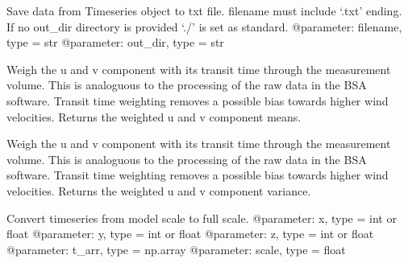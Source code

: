 \documentclass[letterpaper,10pt,english]{sphinxmanual}
\begin{document}
\begin{fulllineitems}
\begin{fulllineitems}
\end{fulllineitems}


\begin{fulllineitems}
\label{\detokenize{index:windtunnel.Timeseries_nc.save2file}}
Save data from Timeseries object to txt file. filename must include
‘.txt’ ending. If no out\_dir directory is provided ‘./’ is set as
standard.
@parameter: filename, type = str
@parameter: out\_dir, type = str

\end{fulllineitems}


\begin{fulllineitems}
\label{\detokenize{index:windtunnel.Timeseries_nc.weighted_component_mean}}
Weigh the u and v component with its transit time through the
measurement volume. This is analoguous to the processing of the raw
data in the BSA software. Transit time weighting removes a possible
bias towards higher wind velocities. Returns the weighted u and v
component means.

\end{fulllineitems}


\begin{fulllineitems}
\label{\detokenize{index:windtunnel.Timeseries_nc.weighted_component_variance}}
Weigh the u and v component with its transit time through the
measurement volume. This is analoguous to the processing of the raw
data in the BSA software. Transit time weighting removes a possible
bias towards higher wind velocities. Returns the weighted u and v
component variance.

\end{fulllineitems}


\end{fulllineitems}


\begin{fulllineitems}
\label{\detokenize{index:windtunnel.adapt_scale}}
Convert timeseries from model scale to full scale. 
@parameter: x, type = int or float
@parameter: y, type = int or float
@parameter: z, type = int or float
@parameter: t\_arr, type = np.array
@parameter: scale, type = float

\end{fulllineitems}
\end{document}
